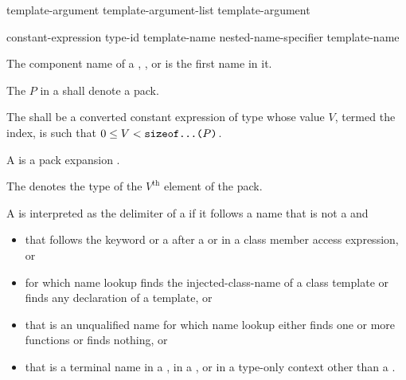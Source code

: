\documentclass{wg21}
\begin{document}
\begin{bnf}
    \br
    template-argument \br
    template-argument-list \terminal{,} template-argument 
\end{bnf}

\begin{bnf}
    \br
    constant-expression\br
    type-id\br
     template-name\br
    nested-name-specifier  template-name
\end{bnf}

\pnum
{}%
The component name of a
,
, or
is the first name in it.

\begin{addedblock}

\pnum
The  $P$ in a 
shall denote a pack.

\pnum
The  shall be
a converted constant expression  of type 
whose value $V$, termed the index,
is such that $0 \le V < \texttt{sizeof...($P$)}$.

\pnum
A  is a pack expansion .

\pnum
\begin{note}
    The  denotes
    the type of the $V^\text{th}$ element of the pack.
\end{note}

\end{addedblock}


\pnum
A \tcode{<} is interpreted as the delimiter of
a 
if it follows a name that is not a  and
\begin{itemize}
    \item
    that follows the keyword  or a \tcode{\~}
    after a  or
    in a class member access expression, or
    \item
    for which name lookup finds the injected-class-name of a class template or
    finds any declaration of a template, or
    \item
    that is an unqualified name
    for which name lookup either finds one or more functions or finds nothing, or
    \item
    that is a terminal name
    in a ,
    in a , or
    in a type-only context
    other than a .
\end{itemize}
\end{document}
